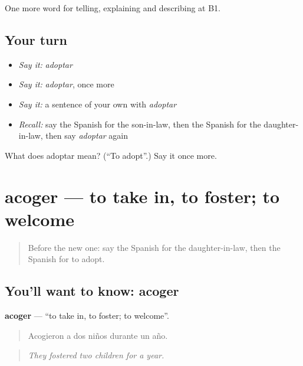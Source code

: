 \begin{grammarlens}[title={What you've built}]
One more word for telling, explaining and describing at B1.
\end{grammarlens}

\subsection*{Your turn}
\begin{itemize}
\raggedright
  \item \emph{Say it:} \emph{adoptar}
  \item \emph{Say it:} \emph{adoptar}, once more
  \item \emph{Say it:} a sentence of your own with \emph{adoptar}
  \item \emph{Recall:} say the Spanish for the son-in-law, then the Spanish for the daughter-in-law, then say \emph{adoptar} again
\end{itemize}

\begin{tcolorbox}[breakable,colback=teal!4,colframe=teal!35!black,title={Before you move on}]
What does adoptar mean? (\textquotedblleft{}To adopt\textquotedblright{}.) Say it once more.
\end{tcolorbox}
\section[acoger]{acoger — to take in, to foster; to welcome}

\label{lesson:ES-C748-acoger}



\begin{quote}
Before the new one: say the Spanish for the daughter-in-law, then the Spanish for to adopt.
\end{quote}

\subsection*{You'll want to know: acoger}
\textbf{acoger} — \textquotedblleft{}to take in, to foster; to welcome\textquotedblright{}.

\begin{quote}
Acogieron a dos niños durante un año.
\end{quote}

\begin{quote}
\emph{They fostered two children for a year.}
\end{quote}

